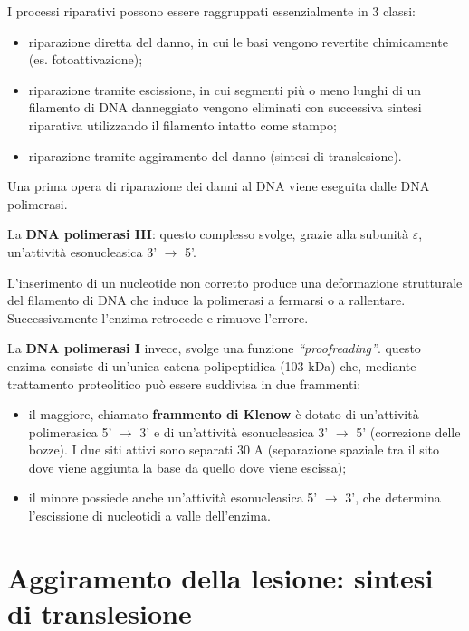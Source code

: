 \documentclass[11pt]{book}
\begin{document}
I processi riparativi possono essere raggruppati essenzialmente in 3
classi:

\begin{itemize}
\itemsep1pt\parskip0pt
\item
  riparazione diretta del danno, in cui le basi vengono revertite
  chimicamente (es. fotoattivazione);
\item
  riparazione tramite escissione, in cui segmenti più o meno lunghi di
  un filamento di DNA danneggiato vengono eliminati con successiva
  sintesi riparativa utilizzando il filamento intatto come stampo;
\item
  riparazione tramite aggiramento del danno (sintesi di translesione).
\end{itemize}

Una prima opera di riparazione dei danni al DNA viene eseguita dalle DNA
polimerasi.

La \textbf{DNA polimerasi III}: questo complesso svolge, grazie alla
subunità \(\varepsilon\), un'attività esonucleasica 3' \(\rightarrow\)
5'.

L'inserimento di un nucleotide non corretto produce una deformazione
strutturale del filamento di DNA che induce la polimerasi a fermarsi o a
rallentare. Successivamente l'enzima retrocede e rimuove l'errore.

La \textbf{DNA polimerasi I} invece, svolge una funzione
\emph{``proofreading''}. questo enzima consiste di un'unica catena
polipeptidica (103 kDa) che, mediante trattamento proteolitico può
essere suddivisa in due frammenti:

\begin{itemize}
\itemsep1pt\parskip0pt
\item
  il maggiore, chiamato \textbf{frammento di Klenow} è dotato di
  un'attività polimerasica 5' \(\rightarrow\) 3' e di un'attività
  esonucleasica 3' \(\rightarrow\) 5' (correzione delle bozze). I due
  siti attivi sono separati 30 A (separazione spaziale tra il sito dove
  viene aggiunta la base da quello dove viene escissa);
\item
  il minore possiede anche un'attività esonucleasica 5' \(\rightarrow\)
  3', che determina l'escissione di nucleotidi a valle dell'enzima.
\end{itemize}

\section{Aggiramento della lesione: sintesi di
translesione}\label{aggiramento-della-lesione-sintesi-di-translesione}
\end{document}
